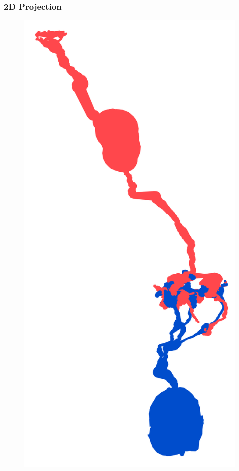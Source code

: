 \documentclass[12pt]{exam}
\begin{document}
	\subsubsection{2D Projection}
	\begin{figure} 
		\includegraphics[width=\linewidth]{smidget_path}
	\end{figure}
\end{document}
